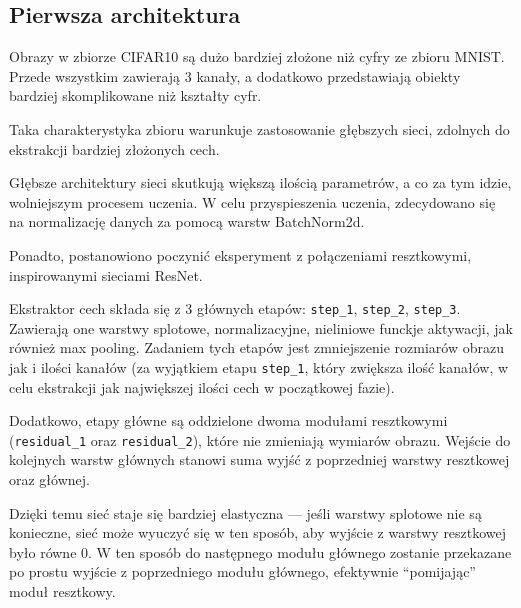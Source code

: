 \documentclass[10pt]{article}
\begin{document}
\subsection*{Pierwsza architektura}

\kubaCifarLarge{}

Obrazy w zbiorze CIFAR10 są dużo bardziej złożone niż cyfry ze zbioru MNIST\@.
Przede wszystkim zawierają 3 kanały, a dodatkowo przedstawiają obiekty bardziej skomplikowane niż kształty cyfr.

Taka charakterystyka zbioru warunkuje zastosowanie głębszych sieci, zdolnych do ekstrakcji bardziej złożonych cech.

Głębsze architektury sieci skutkują większą ilością parametrów, a co za tym idzie, wolniejszym procesem uczenia.
W celu przyspieszenia uczenia, zdecydowano się na normalizację danych za pomocą warstw BatchNorm2d.

Ponadto, postanowiono poczynić eksperyment z połączeniami resztkowymi, inspirowanymi sieciami ResNet.

Ekstraktor cech składa się z 3 głównych etapów: \texttt{step\_1}, \texttt{step\_2}, \texttt{step\_3}.
Zawierają one warstwy splotowe, normalizacyjne, nieliniowe funckje aktywacji, jak również max pooling.
Zadaniem tych etapów jest zmniejszenie rozmiarów obrazu jak i ilości kanałów
(za wyjątkiem etapu \texttt{step\_1}, który zwiększa ilość kanałów, w celu ekstrakcji jak największej ilości cech w początkowej fazie).

Dodatkowo, etapy główne są oddzielone dwoma modułami resztkowymi (\texttt{residual\_1} oraz \texttt{residual\_2}), które nie zmieniają wymiarów obrazu.
Wejście do kolejnych warstw głównych stanowi suma wyjść z poprzedniej warstwy resztkowej oraz głównej.

Dzięki temu sieć staje się bardziej elastyczna --- jeśli warstwy splotowe nie są konieczne, sieć może wyuczyć się w ten sposób, aby wyjście z warstwy resztkowej było równe 0.
W ten sposób do następnego modułu głównego zostanie przekazane po prostu wyjście z poprzedniego modułu głównego, efektywnie ``pomijając'' moduł resztkowy.
\end{document}

